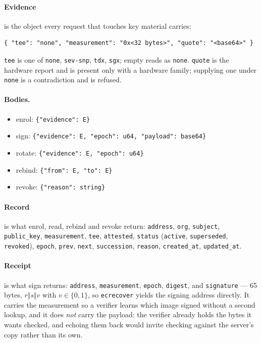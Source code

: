\documentclass[11pt,a4paper]{article}
\newcommand{\code}[1]{\texttt{#1}}
\begin{document}
\paragraph{Evidence} is the object every request that touches key material
carries:
\begin{verbatim}
{ "tee": "none", "measurement": "0x<32 bytes>", "quote": "<base64>" }
\end{verbatim}
\code{tee} is one of \code{none}, \code{sev-snp}, \code{tdx}, \code{sgx}; empty
reads as \code{none}. \code{quote} is the hardware report and is present only
with a hardware family; supplying one under \code{none} is a contradiction and
is refused.

\paragraph{Bodies.}
\begin{itemize}[leftmargin=*]
  \item enrol: \code{\{"evidence": E\}}
  \item sign: \code{\{"evidence": E, "epoch": u64, "payload": base64\}}
  \item rotate: \code{\{"evidence": E, "epoch": u64\}}
  \item rebind: \code{\{"from": E, "to": E\}}
  \item revoke: \code{\{"reason": string\}}
\end{itemize}

\paragraph{Record} is what enrol, read, rebind and revoke return: \code{address},
\code{org}, \code{subject}, \code{public\_key}, \code{measurement}, \code{tee},
\code{attested}, \code{status} (\code{active}, \code{superseded},
\code{revoked}), \code{epoch}, \code{prev}, \code{next}, \code{succession},
\code{reason}, \code{created\_at}, \code{updated\_at}.

\paragraph{Receipt} is what sign returns: \code{address}, \code{measurement},
\code{epoch}, \code{digest}, and \code{signature} --- 65 bytes, $r \Vert s \Vert
v$ with $v \in \{0,1\}$, so \code{ecrecover} yields the signing address directly.
It carries the measurement so a verifier learns which image signed without a
second lookup, and it does \emph{not} carry the payload: the verifier already
holds the bytes it wants checked, and echoing them back would invite checking
against the server's copy rather than its own.
\end{document}
